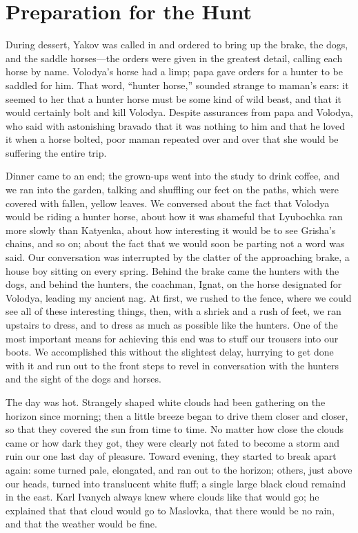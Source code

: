 \chapter{Preparation for the Hunt} %

During dessert, Yakov was called in and ordered to bring up the brake, the dogs, and the saddle horses---the orders were given in the greatest detail, calling each horse by name. Volodya's horse had a limp; papa gave orders for a hunter to be saddled for him. That word, ``hunter horse,'' sounded strange to maman's ears: it seemed to her that a hunter horse must be some kind of wild beast, and that it would certainly bolt and kill Volodya. Despite assurances from papa and Volodya, who said with astonishing bravado that it was nothing to him and that he loved it when a horse bolted, poor maman repeated over and over that she would be suffering the entire trip.

Dinner came to an end; the grown-ups went into the study to drink coffee, and we ran into the garden, talking and shuffling our feet on the paths, which were covered with fallen, yellow leaves. We conversed about the fact that Volodya would be riding a hunter horse, about how it was shameful that Lyubochka ran more slowly than Katyenka, about how interesting it would be to see Grisha's chains, and so on; about the fact that we would soon be parting not a word was said. Our conversation was interrupted by the clatter of the approaching brake, a house boy sitting on every spring. Behind the brake came the hunters with the dogs, and behind the hunters, the coachman, Ignat, on the horse designated for Volodya, leading my ancient nag. At first, we rushed to the fence, where we could see all of these interesting things, then, with a shriek and a rush of feet, we ran upstairs to dress, and to dress as much as possible like the hunters. One of the most important means for achieving this end was to stuff our trousers into our boots. We accomplished this without the slightest delay, hurrying to get done with it and run out to the front steps to revel in conversation with the hunters and the sight of the dogs and horses.

The day was hot. Strangely shaped white clouds had been gathering on the horizon since morning; then a little breeze began to drive them closer and closer, so that they covered the sun from time to time. No matter how close the clouds came or how dark they got, they were clearly not fated to become a storm and ruin our one last day of pleasure. Toward evening, they started to break apart again: some turned pale, elongated, and ran out to the horizon; others, just above our heads, turned into translucent white fluff; a single large black cloud remaind in the east. Karl Ivanych always knew where clouds like that would go; he explained that that cloud would go to Maslovka, that there would be no rain, and that the weather would be fine.


